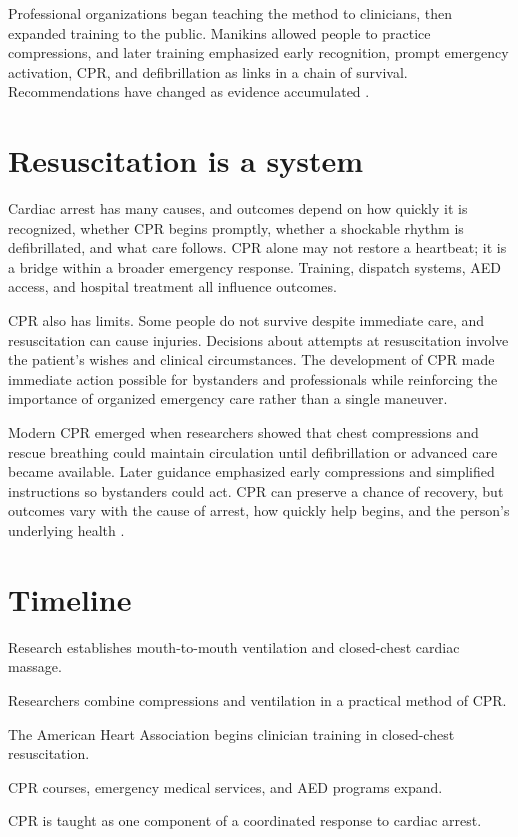 \documentclass[12pt,oneside]{book}
\begin{document}
Professional organizations began teaching the method to clinicians, then
expanded training to the public. Manikins allowed people to practice
compressions, and later training emphasized early recognition, prompt
emergency activation, CPR, and defibrillation as links in a chain of
survival. Recommendations have changed as evidence accumulated
\cite{ahaCprHistory}.

\section{Resuscitation is a system}
Cardiac arrest has many causes, and outcomes depend on how quickly it is
recognized, whether CPR begins promptly, whether a shockable rhythm is
defibrillated, and what care follows. CPR alone may not restore a heartbeat;
it is a bridge within a broader emergency response. Training, dispatch
systems, AED access, and hospital treatment all influence outcomes.

CPR also has limits. Some people do not survive despite immediate care,
and resuscitation can cause injuries. Decisions about attempts at
resuscitation involve the patient's wishes and clinical circumstances.
The development of CPR made immediate action possible for bystanders and
professionals while reinforcing the importance of organized emergency
care rather than a single maneuver.

Modern CPR emerged when researchers showed that chest compressions and rescue
breathing could maintain circulation until defibrillation or advanced care
became available. Later guidance emphasized early compressions and simplified
instructions so bystanders could act. CPR can preserve a chance of recovery,
but outcomes vary with the cause of arrest, how quickly help begins, and the
person’s underlying health \cite{cprHistoryReview,ahaCprHistory}.

\section*{Timeline}
\begin{description}[leftmargin=2.3cm,style=nextline]
  \item[1950s] Research establishes mouth-to-mouth ventilation and closed-chest cardiac massage.
  \item[1960] Researchers combine compressions and ventilation in a practical method of CPR.
  \item[1960s] The American Heart Association begins clinician training in closed-chest resuscitation.
  \item[1970s onward] CPR courses, emergency medical services, and AED programs expand.
  \item[Today] CPR is taught as one component of a coordinated response to cardiac arrest.
\end{description}
\end{document}
